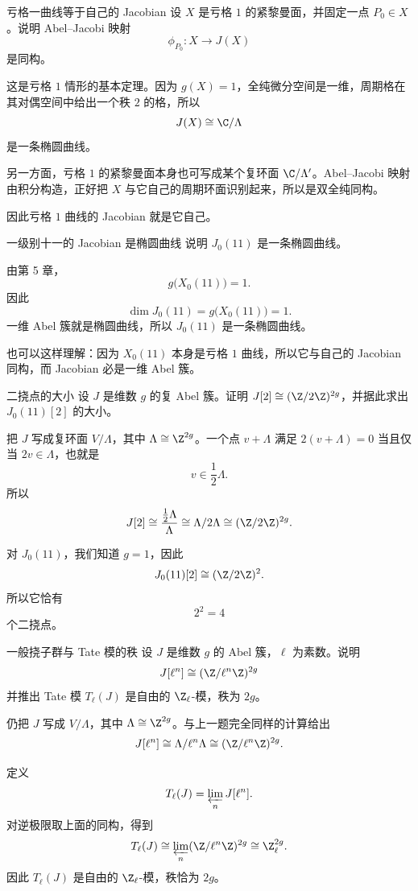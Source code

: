 \begin{problem}{亏格一曲线等于自己的 Jacobian}
\easy
设 $X$ 是亏格 $1$ 的紧黎曼面，并固定一点 $P_0\in X$。说明 Abel--Jacobi 映射
\[
\phi_{P_0}:X\to J(X)
\]
是同构。
\end{problem}
\begin{solution}
这是亏格 $1$ 情形的基本定理。因为 $g(X)=1$，全纯微分空间是一维，周期格在其对偶空间中给出一个秩 $2$ 的格，所以
\[
J(X)\cong \C/\Lambda
\]
是一条椭圆曲线。

另一方面，亏格 $1$ 的紧黎曼面本身也可写成某个复环面 $\C/\Lambda'$。Abel--Jacobi 映射由积分构造，正好把 $X$ 与它自己的周期环面识别起来，所以是双全纯同构。

因此亏格 $1$ 曲线的 Jacobian 就是它自己。
\end{solution}

\begin{problem}{一级别十一的 Jacobian 是椭圆曲线}
\easy
说明 $J_0(11)$ 是一条椭圆曲线。
\end{problem}
\begin{solution}
由第 5 章，
\[
g\bigl(X_0(11)\bigr)=1.
\]
因此
\[
\dim J_0(11)=g\bigl(X_0(11)\bigr)=1.
\]
一维 Abel 簇就是椭圆曲线，所以 $J_0(11)$ 是一条椭圆曲线。

也可以这样理解：因为 $X_0(11)$ 本身是亏格 $1$ 曲线，所以它与自己的 Jacobian 同构，而 Jacobian 必是一维 Abel 簇。
\end{solution}

\begin{problem}{二挠点的大小}
\easy
设 $J$ 是维数 $g$ 的复 Abel 簇。证明 $J[2]\cong (\Z/2\Z)^{2g}$，并据此求出 $J_0(11)[2]$ 的大小。
\end{problem}
\begin{solution}
把 $J$ 写成复环面 $V/\Lambda$，其中 $\Lambda\cong \Z^{2g}$。一个点 $v+\Lambda$ 满足 $2(v+\Lambda)=0$ 当且仅当 $2v\in\Lambda$，也就是
\[
v\in \frac{1}{2}\Lambda.
\]
所以
\[
J[2]\cong \frac{\frac{1}{2}\Lambda}{\Lambda}\cong \Lambda/2\Lambda\cong (\Z/2\Z)^{2g}.
\]

对 $J_0(11)$，我们知道 $g=1$，因此
\[
J_0(11)[2]\cong (\Z/2\Z)^2.
\]
所以它恰有
\[
2^2=4
\]
个二挠点。
\end{solution}

\begin{problem}{一般挠子群与 Tate 模的秩}
\easy
设 $J$ 是维数 $g$ 的 Abel 簇，$\ell$ 为素数。说明
\[
J[\ell^n]\cong (\Z/\ell^n\Z)^{2g}
\]
并推出 Tate 模 $T_\ell(J)$ 是自由的 $\Z_\ell$-模，秩为 $2g$。
\end{problem}
\begin{solution}
仍把 $J$ 写成 $V/\Lambda$，其中 $\Lambda\cong \Z^{2g}$。与上一题完全同样的计算给出
\[
J[\ell^n]\cong \Lambda/\ell^n\Lambda\cong (\Z/\ell^n\Z)^{2g}.
\]

定义
\[
T_\ell(J)=\varprojlim_n J[\ell^n].
\]
对逆极限取上面的同构，得到
\[
T_\ell(J)\cong \varprojlim_n (\Z/\ell^n\Z)^{2g}\cong \Z_\ell^{2g}.
\]
因此 $T_\ell(J)$ 是自由的 $\Z_\ell$-模，秩恰为 $2g$。
\end{solution}

